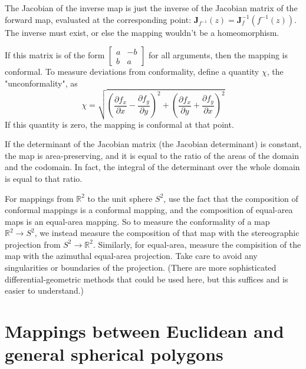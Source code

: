 \documentclass{amsart}[12pt]
\begin{document}
The Jacobian of the inverse map is just the inverse of the Jacobian matrix of the
forward map, evaluated at the corresponding point: $\mathbf{J}_{f^{-1}} (z)
=\mathbf{J}_{f}^{-1} \left(f^{-1}(z)\right)$. The inverse must exist,
or else the mapping wouldn't be a homeomorphism.

If this matrix is of the form $\begin{bmatrix} a & -b\\ b & a \end{bmatrix}$
for all arguments, then the mapping is conformal. To measure deviations from
conformality, define a quantity $\chi$, the "unconformality", as
\begin{equation}
\chi = \sqrt{\left(\dfrac{\partial f_x}{\partial x} -
\dfrac{\partial f_y}{\partial y}\right)^2 +
\left(\dfrac{\partial f_x}{\partial y} +
\dfrac{\partial f_y}{\partial x}\right)^2}
\end{equation}
If this quantity is zero, the mapping is conformal at that point.

If the determinant of the Jacobian matrix (the Jacobian determinant) is constant,
the map is area-preserving, and it is equal to the ratio of the areas of the
domain and the codomain. In fact, the integral of the determinant over the whole
domain is equal to that ratio.

For mappings from $\mathbb{R}^2$ to the unit sphere $S^2$, use the fact that
the composition of conformal mappings is a conformal mapping, and the
composition of equal-area maps is an equal-area mapping. So to measure the
conformality of a map $\mathbb{R}^2 \to S^2$, we instead measure the composition
of that map with the stereographic projection from $S^2 \to \mathbb{R}^2$.
Similarly, for equal-area, measure the compisition of the map with the azimuthal
equal-area projection. Take care to avoid any singularities or boundaries of the
projection. (There are more sophisticated differential-geometric methods that
could be used here, but this suffices and is easier to understand.)

\section{Mappings between Euclidean and general spherical polygons}
\end{document}
